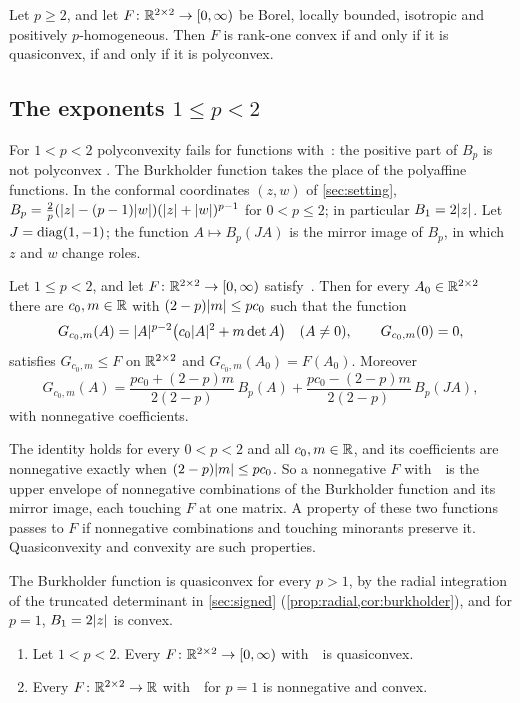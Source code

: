 \begin{corollary}\label{cor:equiv}
Let $p\ge2$, and let $F\colon\mathbb{R}^{2\times 2}\to[0,\infty)$ be Borel, locally bounded, isotropic and
positively $p$-homogeneous. Then $F$ is rank-one convex if and only if it is quasiconvex, if
and only if it is polyconvex.
\end{corollary}

\subsection{The exponents \texorpdfstring{$1\le p<2$}{1 <= p < 2}}\label{sec:intro-low}

For $1<p<2$ polyconvexity fails for functions with~\Hyp: the positive part of $B_p$ is not
polyconvex \cite[Remark~1.4]{GuerraKristensen2022}. The Burkholder function takes the place of
the polyaffine functions. In the conformal coordinates $(z,w)$ of \cref{sec:setting},
$B_p=\tfrac2p(\lvert z\rvert-(p-1)\lvert w\rvert)(\lvert z\rvert+\lvert w\rvert)^{p-1}$ for $0<p\le2$; in particular
$B_1=2\lvert z\rvert$. Let $J=\operatorname{diag}(1,-1)$; the function $A\mapsto B_p(JA)$ is the mirror image of
$B_p$, in which $z$ and $w$ change roles.

\begin{theorem}\label{thm:low}
Let $1\le p<2$, and let $F\colon\mathbb{R}^{2\times 2}\to[0,\infty)$ satisfy~\Hyp. Then for every $A_0\in\mathbb{R}^{2\times 2}$ there
are $c_0,m\in\mathbb{R}$ with $(2-p)\lvert m\rvert\le pc_0$ such that the function
\[
  G_{c_0,m}(A)=\lvert A\rvert^{p-2}\bigl(c_0\lvert A\rvert^2+m\det A\bigr)\quad(A\ne0),\qquad G_{c_0,m}(0)=0,
\]
satisfies $G_{c_0,m}\le F$ on $\mathbb{R}^{2\times 2}$ and $G_{c_0,m}(A_0)=F(A_0)$. Moreover
\[
  G_{c_0,m}(A)=\frac{pc_0+(2-p)m}{2(2-p)}\,B_p(A)+\frac{pc_0-(2-p)m}{2(2-p)}\,B_p(JA),
\]
with nonnegative coefficients.
\end{theorem}

The identity holds for every $0<p<2$ and all $c_0,m\in\mathbb{R}$, and its coefficients are
nonnegative exactly when $(2-p)\lvert m\rvert\le pc_0$. So a nonnegative $F$ with~\Hyp\ is the upper
envelope of nonnegative combinations of the Burkholder function and its mirror image, each
touching $F$ at one matrix. A property of these
two functions passes to $F$ if nonnegative combinations and touching minorants preserve it.
Quasiconvexity and convexity are such properties.

The Burkholder function is quasiconvex for every $p>1$, by the radial integration of the
truncated determinant in \cref{sec:signed} (\cref{prop:radial,cor:burkholder}), and for $p=1$,
$B_1=2\lvert z\rvert$ is convex.

\begin{corollary}\label{cor:low}
\begin{enumerate}[label=\textup{(\alph*)}]
\item Let $1<p<2$. Every $F\colon\mathbb{R}^{2\times 2}\to[0,\infty)$ with~\Hyp\ is quasiconvex.
\item Every $F\colon\mathbb{R}^{2\times 2}\to\mathbb{R}$ with~\Hyp\ for $p=1$ is nonnegative and convex.
\end{enumerate}
\end{corollary}

